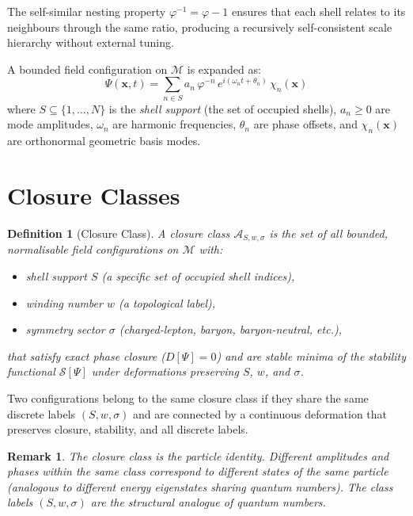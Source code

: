 \documentclass[12pt]{article}
\newtheorem{definition}[theorem]{Definition}
\newtheorem{remark}[theorem]{Remark}
\newcommand{\Acal}{\mathcal{A}}
\newcommand{\Scal}{\mathcal{S}}
\newcommand{\Mcal}{\mathcal{M}}
\newcommand{\phig}{\varphi}
\newcommand{\Psif}{\Psi}
\begin{document}
The self-similar nesting property $\phig^{-1} = \phig - 1$ ensures that each shell relates to its neighbours through the same ratio, producing a recursively self-consistent scale hierarchy without external tuning.

A bounded field configuration on $\Mcal$ is expanded as:
\begin{equation}\label{eq:field}
    \Psif(\mathbf{x}, t) = \sum_{n \in S} a_n\, \phig^{-n}\, e^{i(\omega_n t + \theta_n)}\, \chi_n(\mathbf{x})
\end{equation}
where $S \subseteq \{1, \ldots, N\}$ is the \textit{shell support} (the set of occupied shells), $a_n \geq 0$ are mode amplitudes, $\omega_n$ are harmonic frequencies, $\theta_n$ are phase offsets, and $\chi_n(\mathbf{x})$ are orthonormal geometric basis modes.

\section{Closure Classes}\label{sec:classes}

\begin{definition}[Closure Class]\label{def:class}
A \textit{closure class} $\Acal_{S,w,\sigma}$ is the set of all bounded, normalisable field configurations on $\Mcal$ with:
\begin{itemize}
    \item shell support $S$ (a specific set of occupied shell indices),
    \item winding number $w$ (a topological label),
    \item symmetry sector $\sigma$ (charged-lepton, baryon, baryon-neutral, etc.),
\end{itemize}
that satisfy exact phase closure ($D[\Psif] = 0$) and are stable minima of the stability functional $\Scal[\Psif]$ under deformations preserving $S$, $w$, and $\sigma$.
\end{definition}

Two configurations belong to the same closure class if they share the same discrete labels $(S, w, \sigma)$ and are connected by a continuous deformation that preserves closure, stability, and all discrete labels.

\begin{remark}
The closure class is the particle identity. Different amplitudes and phases within the same class correspond to different states of the same particle (analogous to different energy eigenstates sharing quantum numbers). The class labels $(S, w, \sigma)$ are the structural analogue of quantum numbers.
\end{remark}
\end{document}
